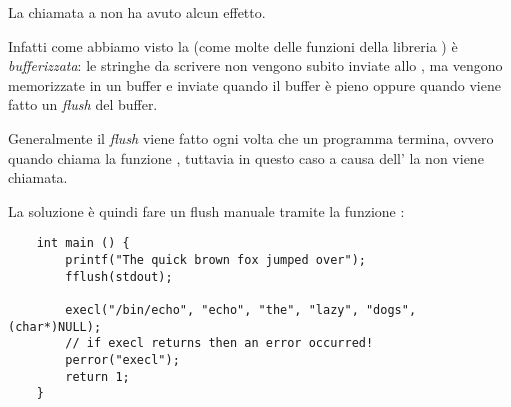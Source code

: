 La chiamata a  non ha avuto alcun effetto.

Infatti come abbiamo visto la  (come molte delle funzioni della libreria ) è \emph{bufferizzata}: le stringhe da scrivere non vengono subito inviate allo , ma vengono memorizzate in un buffer e inviate quando il buffer è pieno oppure quando viene fatto un \emph{flush} del buffer.

Generalmente il \emph{flush} viene fatto ogni volta che un programma termina, ovvero quando chiama la funzione , tuttavia in questo caso a causa dell' la  non viene chiamata.

La soluzione è quindi fare un flush manuale tramite la funzione :
\begin{verbatim}
    int main () {
        printf("The quick brown fox jumped over");
        fflush(stdout);
        
        execl("/bin/echo", "echo", "the", "lazy", "dogs", (char*)NULL); 
        // if execl returns then an error occurred!
        perror("execl");
        return 1;
    }
\end{verbatim}